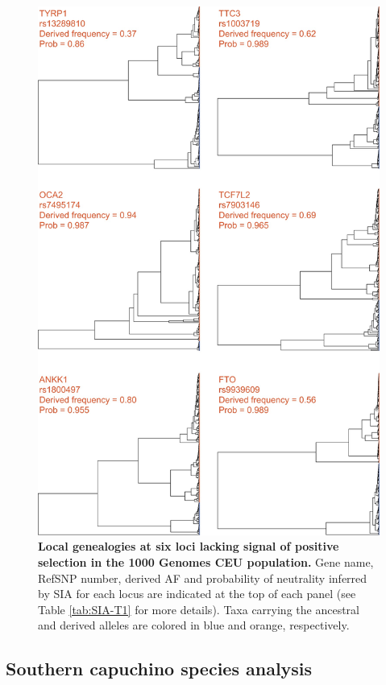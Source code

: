\begin{figure}
    \centering
    \includegraphics[scale=0.25]{SIA_figs/SIA_F6.jpeg}
    \caption[Local genealogies at six loci lacking signal of positive selection in the 1000 Genomes CEU population.]{\textbf{Local genealogies at six loci lacking signal of positive selection in the 1000 Genomes CEU population.} Gene name, RefSNP number, derived AF and probability of neutrality inferred by \ac{SIA} for each locus are indicated at the top of each panel (see Table \ref{tab:SIA-T1} for more details). Taxa carrying the ancestral and derived alleles are colored in blue and orange, respectively.}
    \label{fig:SIA-F6}
\end{figure}

\subsection{Southern capuchino species analysis}


